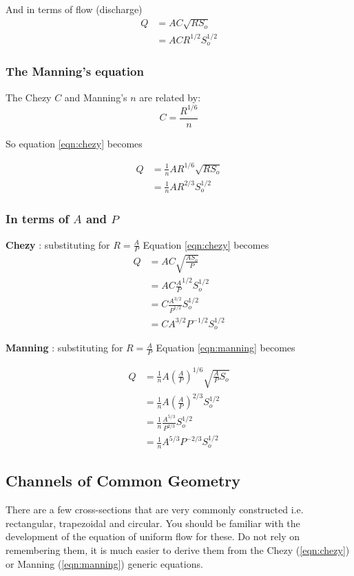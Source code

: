 \documentclass[a4paper, 12pt, british]{article} %
\numberwithin{equation}{section}
\numberwithin{figure}{section}
\numberwithin{table}{section}
\begin{document}
	And in terms of flow (discharge)
	\begin{align}
	Q &= A C \sqrt{RS_o}  \nonumber \\
	&= ACR^{1/2}S_o^{1/2}
	\label{eqn:chezy}
	\end{align}
	
	\subsubsection*{The Manning's equation}
	The Chezy $C$ and Manning's $n$ are related by:
	\begin{equation}
	C = \frac{R^{1/6}}{n} 
	\label{eqn:chezyn}
	\end{equation}
	
	So equation \ref{eqn:chezy} becomes
	
	\begin{align}
	Q &= \frac{1}{n}AR^{1/6}\sqrt{RS_o} \nonumber \\
	&= \frac{1}{n}AR^{2/3}S_o^{1/2}
	\label{eqn:manning}
	\end{align}
	
	\subsubsection*{In terms of $A$ and $P$}
	\textbf{Chezy} : substituting for $R = \frac{A}{P}$ Equation \ref{eqn:chezy} becomes
	\begin{align}
	Q &= A C \sqrt{\frac{AS_o}{P}}  \nonumber \\
	&= AC{\frac{A}{P}}^{1/2}S_o^{1/2} \nonumber \\
	&= C \frac{A^{3/2}}{P^{1/2}} S_o^{1/2} \nonumber \\
	&= CA^{3/2}{P}^{-1/2} S_o^{1/2} 
	\label{eqn:chezy_ap}
	\end{align}
	
	\textbf{Manning} : substituting for $R = \frac{A}{P}$ Equation \ref{eqn:manning} becomes
	
	\begin{align}
	Q &= \frac{1}{n}A \left( \frac{A}{P} \right)^{1/6} \sqrt{\frac{A}{P}S_o} \nonumber \\
	&= \frac{1}{n}A\left(\frac{A}{P}\right)^{2/3}S_o^{1/2} \nonumber \\
	&= \frac{1}{n}\frac{A^{5/3}}{P^{2/3}}S_o^{1/2} \nonumber \\
	&= \frac{1}{n} A^{5/3} P^{-2/3} S_o^{1/2} 
	\end{align}
	
	
	\subsection*{Channels of Common Geometry}
	There are a few cross-sections that are very commonly constructed i.e. rectangular, trapezoidal and circular. You should be familiar with the development of the equation of uniform flow for these. Do not rely on remembering them, it is much easier to derive them from the Chezy (\ref{eqn:chezy}) or Manning (\ref{eqn:manning}) generic equations.
	
\end{document}
